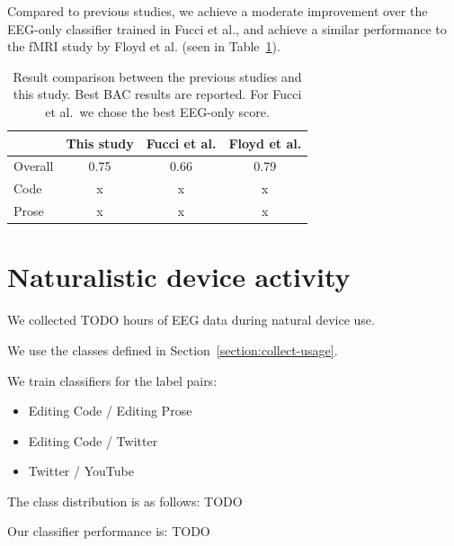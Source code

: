         Compared to previous studies, we achieve a moderate improvement over the EEG-only classifier trained in Fucci et al., and achieve a similar performance to the fMRI study by Floyd et al. (seen in Table~\ref{table:compare-results}).

        \begin{table}
            \begin{center}
                \begin{tabular}{lccc}
                    \toprule
                    & \textbf{This study} & \textbf{Fucci et al.} & \textbf{Floyd et al.} \\
                    \midrule
                    Overall & 0.75 & 0.66 & 0.79 \\
                    Code & x & x & x \\
                    Prose & x & x & x \\
                    \bottomrule
                \end{tabular}
                \caption{Result comparison between the previous studies and this study. Best BAC results are reported. For Fucci et al.\ we chose the best EEG-only score.}\label{table:compare-results}
            \end{center}
        \end{table}

    \section{Naturalistic device activity}

        We collected TODO hours of EEG data during natural device use.

        We use the classes defined in Section~\ref{section:collect-usage}.

        We train classifiers for the label pairs:

        \begin{itemize}
                \item Editing Code / Editing Prose
                \item Editing Code / Twitter
                \item Twitter / YouTube
        \end{itemize}

        The class distribution is as follows: TODO

        Our classifier performance is: TODO

